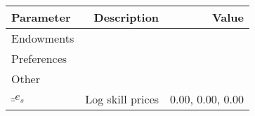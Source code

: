 \begin{tabular}{lrr}
\hline
Parameter & Description  & Value  \\
\hline
Endowments &   &   \\
Preferences &   &   \\
Other &   &   \\
$\hat_{e}_{s}$ & Log skill prices  & 0.00, 0.00, 0.00  \\
\hline
\end{tabular}%
